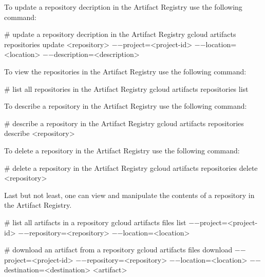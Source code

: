 To update a repository decription in the Artifact Registry use the following command:
\begin{bash}
# update a repository decription in the Artifact Registry
gcloud artifacts repositories update <repository>
    $-$$-$project=<project-id>
    $-$$-$location=<location>
    $-$$-$description=<description>
\end{bash}

To view the repositories in the Artifact Registry use the following command:
\begin{bash}
# list all repositories in the Artifact Registry
gcloud artifacts repositories list
\end{bash}

To describe a repository in the Artifact Registry use the following command:
\begin{bash}
# describe a repository in the Artifact Registry
gcloud artifacts repositories describe <repository>
\end{bash}

To delete a repository in the Artifact Registry use the following command:
\begin{bash}
# delete a repository in the Artifact Registry
gcloud artifacts repositories delete <repository>
\end{bash}

Last but not least, one can view and manipulate the contents of a repository in the Artifact Registry.

\begin{bash}
# list all artifacts in a repository
gcloud artifacts files list
    $-$$-$project=<project-id>
    $-$$-$repository=<repository>
    $-$$-$location=<location>
\end{bash}

\begin{bash}
# download an artifact from a repository
gcloud artifacts files download
    $-$$-$project=<project-id>
    $-$$-$repository=<repository>
    $-$$-$location=<location>
    $-$$-$destination=<destination>
    <artifact>
\end{bash}